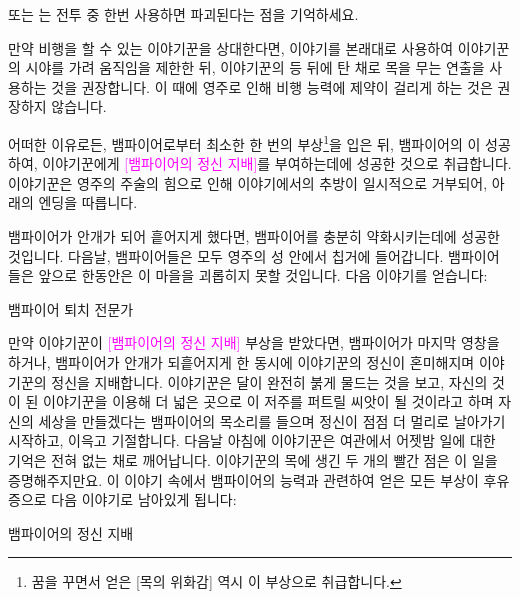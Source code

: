 \documentclass{report}
\begin{document}
	 또는 는 전투 중 한번 사용하면 파괴된다는 점을 기억하세요.
	
	만약 비행을 할 수 있는 이야기꾼을 상대한다면,  이야기를 본래대로 사용하여 이야기꾼의 시야를 가려 움직임을 제한한 뒤, 이야기꾼의 등 뒤에 탄 채로 목을 무는 연출을 사용하는 것을 권장합니다. 이 때에 영주로 인해 비행 능력에 제약이 걸리게 하는 것은 권장하지 않습니다.
	
	어떠한 이유로든, 뱀파이어로부터 최소한 한 번의 부상\footnote{꿈을 꾸면서 얻은 \textcolor{RubineRed}{[목의 위화감]} 역시 이 부상으로 취급합니다.}을 입은 뒤, 뱀파이어의 이 성공하여, 이야기꾼에게 \textcolor{Magenta}{[뱀파이어의 정신 지배]}를 부여하는데에 성공한 것으로 취급합니다. 이야기꾼은 영주의 주술의 힘으로 인해 이야기에서의 추방이 일시적으로 거부되어, 아래의 엔딩을 따릅니다.
	
	\medskip
	
	뱀파이어가 안개가 되어 흩어지게 했다면, 뱀파이어를 충분히 약화시키는데에 성공한 것입니다. 다음날, 뱀파이어들은 모두 영주의 성 안에서 칩거에 들어갑니다. 뱀파이어들은 앞으로 한동안은 이 마을을 괴롭히지 못할 것입니다. 다음 이야기를 얻습니다:
	
	\begin{lite}{뱀파이어 퇴치 전문가}
	\end{lite}
	
	만약 이야기꾼이 \textcolor{Magenta}{[뱀파이어의 정신 지배]} 부상을 받았다면, 뱀파이어가 마지막 영창을 하거나, 뱀파이어가 안개가 되흩어지게 한 동시에 이야기꾼의 정신이 혼미해지며 이야기꾼의 정신을 지배합니다. 이야기꾼은 달이 완전히 붉게 물드는 것을 보고, 자신의 것이 된 이야기꾼을 이용해 더 넓은 곳으로 이 저주를 퍼트릴 씨앗이 될 것이라고 하며 자신의 세상을 만들겠다는 뱀파이어의 목소리를 들으며 정신이 점점 더 멀리로 날아가기 시작하고, 이윽고 기절합니다. 다음날 아침에 이야기꾼은 여관에서 어젯밤 일에 대한 기억은 전혀 없는 채로 깨어납니다. 이야기꾼의 목에 생긴 두 개의 빨간 점은 이 일을 증명해주지만요. 이 이야기 속에서 뱀파이어의 능력과 관련하여 얻은 모든 부상이 후유증으로 다음 이야기로 남아있게 됩니다:
	
	\begin{lite}{뱀파이어의 정신 지배}
		
	\end{lite}
	
	
	
\end{document}
